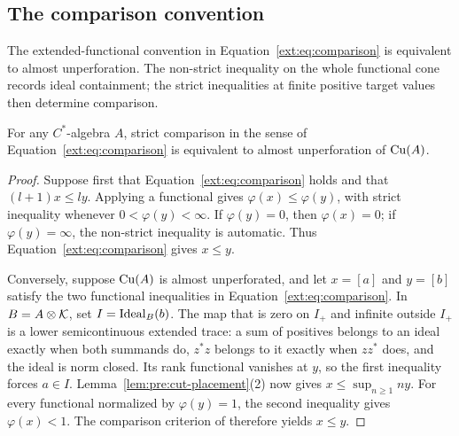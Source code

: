 \subsection{The comparison convention}

The extended-functional convention in
Equation~\eqref{ext:eq:comparison} is equivalent to almost
unperforation. The non-strict inequality on the whole functional cone
records ideal containment; the strict inequalities at finite positive
target values then determine comparison.

\begin{lemma}
\label{lem:comparison-convention}
For any $C^*$-algebra $A$, strict comparison in the sense of
Equation~\eqref{ext:eq:comparison} is equivalent to almost unperforation
of $\mathrm{Cu}(A)$.
\end{lemma}

\begin{proof}
Suppose first that Equation~\eqref{ext:eq:comparison} holds and that
$(l+1)x\le ly$. Applying a functional gives
$\varphi(x)\le\varphi(y)$, with strict inequality whenever
$0<\varphi(y)<\infty$. If $\varphi(y)=0$, then $\varphi(x)=0$;
if $\varphi(y)=\infty$, the non-strict inequality is automatic.
Thus Equation~\eqref{ext:eq:comparison} gives $x\le y$.

Conversely, suppose $\mathrm{Cu}(A)$ is almost unperforated, and let
$x=[a]$ and $y=[b]$ satisfy the two functional inequalities in
Equation~\eqref{ext:eq:comparison}. In $B=A\otimes\mathcal K$, set
$I=\operatorname{Ideal}_B(b)$. The map that is zero on $I_+$ and infinite outside
$I_+$ is a lower semicontinuous extended trace: a sum of positives
belongs to an ideal exactly when both summands do, $z^*z$ belongs to it
exactly when $zz^*$ does, and the ideal is norm closed. Its rank
functional vanishes at $y$, so the first inequality forces $a\in I$.
Lemma~\ref{lem:pre:cut-placement}(2) now gives
$x\le\sup_{n\ge1}ny$. For every functional normalized by
$\varphi(y)=1$, the second inequality gives $\varphi(x)<1$.
The comparison criterion of
\cite[Proposition~6.2]{ERS2011} therefore yields $x\le y$.
\end{proof}
